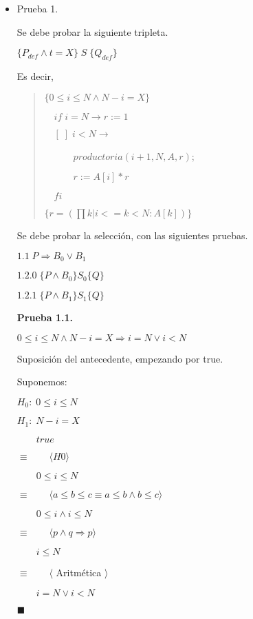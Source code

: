 \documentclass[hidelinks]{article}
\newenvironment{absolutelynopagebreak}
{\Needspace{10\baselineskip}\begin{quote}}
		{\end{quote}}
\begin{document}
\begin{itemize}
	\item Prueba 1.\par
	      Se debe probar la siguiente tripleta.\par
	      $\{P_{def} \land t = X\} \; S \; \{Q_{def}\}$\par
	      Es decir,\par
	      \begin{absolutelynopagebreak}
		      $\{0 \leq i \leq N \land N - i = X\}$\par
		      $\quad  if \; i = N \rightarrow r := 1$\par
		      $\quad  [\;] \; i < N \rightarrow $\par
		      $\quad \qquad productoria(i + 1, N, A, r)$;\par
		      $\quad \qquad r := A[i] * r $\par
		      $\quad  fi$\par
		      $\{r = (\prod k | i <= k < N: A[k])\}$\par
	      \end{absolutelynopagebreak}

	      Se debe probar la selección, con las siguientes pruebas.\par
	      $1.1 \; P \Rightarrow B_0 \lor B_1$\par
	      $1.2.0 \; \{P \land B_0\} S_0 \{Q\}$\par
	      $1.2.1 \; \{P \land B_1\} S_1 \{Q\}$\par

	      \textbf{Prueba 1.1.}\par
	      $0 \leq i \leq N \land N - i = X \Rightarrow i = N \lor i < N$\par

	      Suposición del antecedente, empezando por true.\par

	      Suponemos:\par
	      $H_0: \; 0 \leq i \leq N$\par
	      $H_1: \; N - i = X$\par

	      $\qquad true$\par
	      $\equiv \qquad \langle H0 \rangle$\par
	      $\qquad 0 \leq i \leq N$\par
	      $\equiv \qquad \langle a \leq b \leq c \equiv a \leq b \land b \leq c \rangle$\par
	      $\qquad 0 \leq i \land i \leq N$\par
	      $\equiv \qquad \langle p \land q \Rightarrow p \rangle$\par
	      $\qquad i \leq N$\par
	      $\equiv \qquad \langle$ Aritmética $\rangle$\par
	      $\qquad i = N \lor i < N$\par
	      $\blacksquare$\par


\end{itemize}
\end{document}
